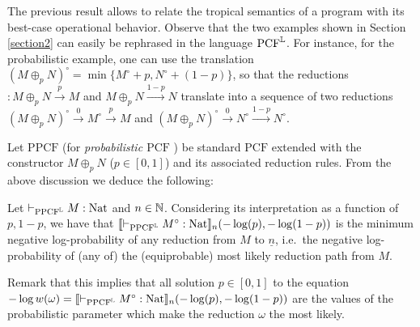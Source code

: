 The previous result allows to relate the tropical semantics of a program with its best-case operational behavior.  
Observe that the two examples shown in Section \ref{section2} can easily be rephrased in the language $\mathrm{PCF}^{\mathbb{L}}$. 
For instance, for the probabilistic example, %
one can use the translation $(M\oplus_{p}N)^{\circ}= \min\{M^{\circ}+p, N^{\circ}+(1-p)\}$, so that the reductions $:M\oplus_{p}N\stackrel{p}{\to} M$ and $M\oplus_{p}N\stackrel{1-p}{\to} N$ translate into a sequence of two reductions $(M\oplus_{p}N)^{\circ} \stackrel{0}{\to} M^{\circ}\stackrel{p}{\to} M$ and $(M\oplus_{p}N)^{\circ} \stackrel{0}{\to} N^{\circ}\stackrel{1-p}{\to} N^{\circ}$.%

Let $\mathrm{PPCF}$ (for \emph{probabilistic $\mathrm{PCF}$} \cite{Pagani2018}) be standard $\mathrm{PCF}$ extended with the constructor $M\oplus_{p}N$ ($p\in[0,1]$) and its associated reduction rules. From the above discussion we deduce the following:

\begin{corollary}
Let $\vdash_{\mathrm{PPCF}^{\mathbb{L}}} M:\mathrm{Nat}$ and $n\in\mathbb{N}$.
Considering its interpretation as a function of $p,1-p$, we have that $\llbracket\vdash_{\mathrm{PPCF}^{\mathbb{L}}} M^{\circ}:\mathrm{Nat}\rrbracket_{n}(-\log(p),-\log(1-p))$%
is the minimum negative log-probability of any reduction from $M$ to $\underline n$, i.e.\ the negative log-probability of (any of) the (equiprobable) most likely reduction path from $M$.
\end{corollary}

Remark that this implies that all solution $p\in[0,1]$ to the equation $-\log w(\omega)= \llbracket\vdash_{\mathrm{PPCF}^{\mathbb{L}}} M^{\circ}:\mathrm{Nat}\rrbracket_{n}(-\log(p),-\log(1-p))$ are the values of the probabilistic parameter which make the reduction $\omega$ the most likely.


